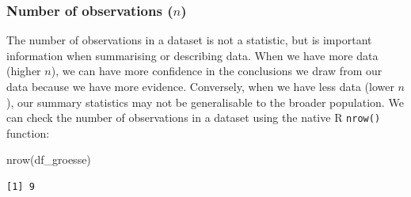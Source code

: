 \documentclass[
  letterpaper,
  DIV=11,
  numbers=noendperiod]{scrartcl}
\newenvironment{Shaded}{\begin{snugshade}}{\end{snugshade}}
\newcommand{\FunctionTok}[1]{\textcolor[rgb]{0.28,0.35,0.67}{#1}}
\newcommand{\NormalTok}[1]{\textcolor[rgb]{0.00,0.23,0.31}{#1}}
\begin{document}
\hypertarget{number-of-observations-n}{%
\subsubsection{\texorpdfstring{Number of observations
(\(n\))}{Number of observations (n)}}\label{number-of-observations-n}}

The number of observations in a dataset is not a statistic, but is
important information when summarising or describing data. When we have
more data (higher \(n\)), we can have more confidence in the conclusions
we draw from our data because we have more evidence. Conversely, when we
have less data (lower \(n\)), our summary statistics may not be
generalisable to the broader population. We can check the number of
observations in a dataset using the native R \texttt{nrow()} function:

\begin{Shaded}
\begin{Highlighting}[]
\FunctionTok{nrow}\NormalTok{(df\_groesse)}
\end{Highlighting}
\end{Shaded}

\begin{verbatim}
[1] 9
\end{verbatim}
\end{document}
